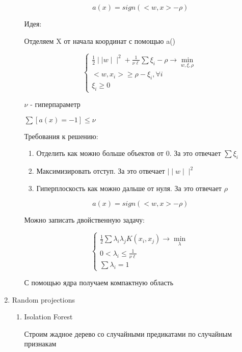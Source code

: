 \documentclass[a4paper, 12pt]{article}
\begin{document}
\begin{enumerate}
\begin{enumerate}
        \[a(x) = sign(<w, x> - \rho)\]

        Идея:

        Отделяем X от начала координат с помощью a()

        \[\begin{cases}
            \frac{1}{2}\mid\mid w \mid\mid^2 + 
            \frac{1}{\nu \ell}\sum \xi_i - \rho
            \rightarrow \min_{w, \xi, \rho} \\
            <w, x_i> \geq \rho - \xi_i, \forall i \\
            \xi_i \geq 0
        \end{cases}\]
        
        $\nu$ - гиперпараметр

        $\sum [a(x) = -1] \leq \nu$

        Требования к решению:

        \begin{enumerate}
            \item Отделить как можно больше объектов от 0.
            За это отвечает $\sum \xi_i$
            \item Максимизировать отступ. 
            За это отвечает $\mid\mid w \mid\mid^{2}$
            \item Гиперплоскость как можно дальше от нуля.
            За это отвечает $\rho$
        \end{enumerate}

        \[a(x) = sign(<w, x> - \rho)\]

        Можно записать двойственную задачу:

        \[
        \begin{cases}
            \frac{1}{2}\sum \lambda_i\lambda_jK(x_i, x_j)
            \rightarrow \min_{\lambda} \\
            0 < \lambda_i \leq \frac{1}{\nu \ell} \\
            \sum \lambda_i = 1
        \end{cases}    
        \]

        С помощью ядра получаем компактную область
    \end{enumerate}

    \item Random projections
    \begin{enumerate}
        \item Isolation Forest
        
        Строим жадное дерево со случайными предикатами по
        случайным признакам


\end{enumerate}
\end{enumerate}
\end{document}
